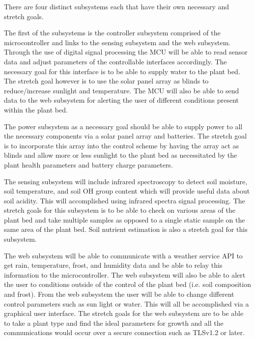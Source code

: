 



There are four distinct subsystems each that have their own necessary and stretch goals.

The first of the subsystems is the controller subsystem comprised of the microcontroller and links to the sensing subsystem and the web subsystem. Through the use of digital signal processing the MCU will be able to read sensor data and adjust parameters of the controllable interfaces accordingly. The necessary goal for this interface is to be able to supply water to the plant bed. The stretch goal however is to use the solar panel array as blinds to reduce/increase sunlight and temperature. The MCU will also be able to send data to the web subsystem for alerting the user of different conditions present within the plant bed.

The power subsystem as a necessary goal should be able to supply power to all the necessary components via a solar panel array and batteries. The stretch goal is to incorporate this array into the control scheme by having the array act as blinds and allow more or less sunlight to the plant bed as necessitated by the plant health parameters and battery charge parameters.

The sensing subsystem will include infrared spectroscopy to detect soil moisture, soil temperature, and soil OH group content which will provide useful data about soil acidity. This will accomplished using infrared spectra signal processing. The stretch goals for this subsystem is to be able to check on various areas of the plant bed and take multiple samples as opposed to a single static sample on the same area of the plant bed. Soil nutrient estimation is also a stretch goal for this subsystem.

The web subsystem will be able to communicate with a weather service API to get rain, temperature, frost, and humidity data and be able to relay this information to the microcontroller. The web subsystem will also be able to alert the user to conditions outside of the control of the plant bed (i.e. soil composition and frost). From the web subsystem the user will be able to change different control parameters such as sun light or water. This will all be accomplished via a graphical user interface. The stretch goals for the web subsystem are to be able to take a plant type and find the ideal parameters for growth and all the communications would occur over a secure connection such as TLSv1.2 or later.
